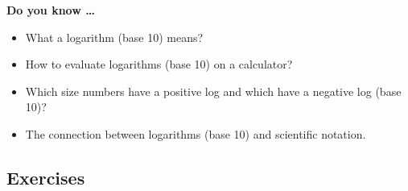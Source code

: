 \noindent \textbf{Do you know \ldots}

\begin{itemize}
\item What a logarithm (base 10) means? 
\item How to evaluate logarithms (base 10) on a calculator? 
\item Which size numbers have a positive log and which have a negative log (base 10)?
\item The connection between logarithms (base 10) and scientific notation.

\end{itemize}

\subsection*{Exercises}



